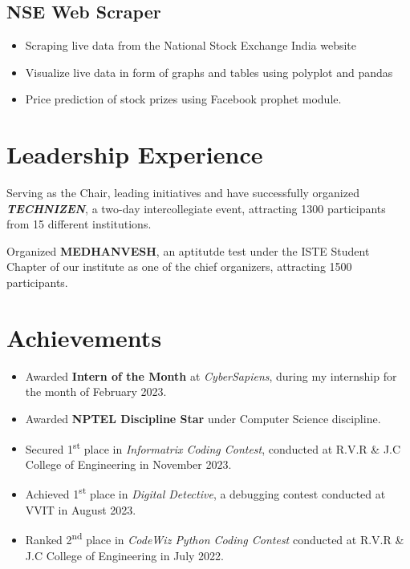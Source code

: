 \documentclass[]{roshan-resume}
\begin{document}
\begin{minipage}[t]{0.66\textwidth}
		\subsection{NSE Web Scraper}
		\begin{itemize}
			\item Scraping live data from the National Stock Exchange India website
			\item Visualize live data in form of graphs and tables using polyplot and pandas
			\item Price prediction of stock prizes using Facebook prophet module.
		\end{itemize}
		
		\section{Leadership Experience}
		 \hfill {}
		\begin{tightemize}
			\item Serving as the Chair, leading initiatives and have successfully organized \textbf{\textit{TECHNIZEN}}, a two-day intercollegiate event, attracting 1300 participants from 15 different institutions.
		\end{tightemize}
		\hfill {}
		\begin{tightemize}
			\item Organized \textbf{MEDHANVESH}, an aptitutde test under the ISTE Student Chapter of our institute as one of the chief organizers, attracting 1500 participants.
		\end{tightemize}
		
		
		\section{Achievements} 
		\begin{itemize}
			\item Awarded \textbf{Intern of the Month} at \textit{CyberSapiens}, during my internship for the month of February 2023.
			\item Awarded \textbf{NPTEL Discipline Star} under Computer Science discipline.
			\item Secured 1\textsuperscript{st} place in \textit{Informatrix Coding Contest}, conducted at R.V.R \& J.C College of Engineering in November 2023.
			\item Achieved 1\textsuperscript{st} place in \textit{Digital Detective}, a debugging contest conducted at VVIT in August 2023.
			\item Ranked 2\textsuperscript{nd} place in \textit{CodeWiz Python Coding Contest} conducted at R.V.R \& J.C College of Engineering in July 2022.
		\end{itemize}
		

\end{minipage}
\end{document}
